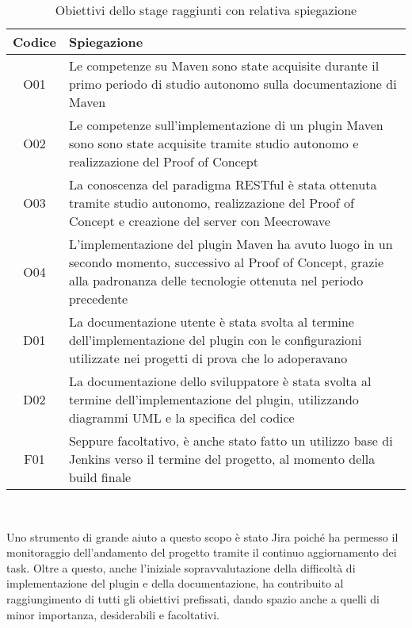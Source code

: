     \begin{table}[H]
        {\def\arraystretch{1.5}
        \begin{tabularx}{\textwidth}{cX}
            \rowcolor{beautyblue}
            \textbf{Codice} &
            \textbf{Spiegazione} \\ \hline

            O01 & Le competenze su Maven sono state acquisite durante il primo periodo di studio autonomo sulla documentazione di Maven \\
            O02 & Le competenze sull'implementazione di un plugin Maven sono sono state acquisite tramite studio autonomo e realizzazione del Proof of Concept \\
            O03 & La conoscenza del paradigma RESTful è stata ottenuta  tramite studio autonomo, realizzazione del Proof of Concept e creazione del server con Meecrowave \\
            O04 & L'implementazione del plugin Maven ha avuto luogo in un secondo momento, successivo al Proof of Concept, grazie alla padronanza delle tecnologie ottenuta nel periodo precedente \\
            D01 & La documentazione utente è stata svolta al termine dell'implementazione del plugin con le configurazioni utilizzate nei progetti di prova che lo adoperavano \\
            D02 & La documentazione dello sviluppatore è stata svolta al termine dell'implementazione del plugin, utilizzando diagrammi UML e la specifica del codice \\
            F01 & Seppure facoltativo, è anche stato fatto un utilizzo base di Jenkins verso il termine del progetto, al momento della build finale \\
            
        \end{tabularx}} \\
    \caption{Obiettivi dello stage raggiunti con relativa spiegazione}
    \label{tabellaObiettiviRaggiunti}
    \end{table}

    Uno strumento di grande aiuto a questo scopo è stato Jira poiché ha permesso il monitoraggio dell'andamento del progetto tramite il continuo aggiornamento dei task.
    Oltre a questo, anche l'iniziale sopravvalutazione della difficoltà di implementazione del plugin e della documentazione, ha contribuito al raggiungimento di tutti gli obiettivi prefissati, dando spazio anche a quelli di minor importanza, desiderabili e facoltativi. 



